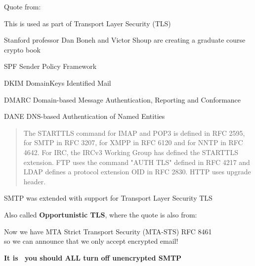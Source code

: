 \documentclass[Screen16to9,17pt]{foils}
\begin{document}
\begin{list2}
\item Quote from: {\small {}}
\item This is used as part of Transport Layer Security (TLS)
\item Stanford professor Dan Boneh and Victor Shoup are creating a graduate course crypto book  
\end{list2}



\begin{list2}
\item SPF Sender Policy Framework\\ {\footnotesize{}}
\item DKIM DomainKeys Identified Mail\\
{\footnotesize{}}
\item DMARC Domain-based Message Authentication, Reporting and Conformance\\
{\footnotesize{}}
\item DANE DNS-based Authentication of Named Entities\\ {\footnotesize{}}
\end{list2}



\begin{quote}
The STARTTLS command for IMAP and POP3 is defined in RFC 2595, for SMTP in RFC 3207, for XMPP in RFC 6120 and for NNTP in RFC 4642. For IRC, the IRCv3 Working Group
 has defined the STARTTLS extension. FTP uses the command "AUTH TLS" defined in RFC 4217 and LDAP defines a protocol extension OID in RFC 2830. HTTP uses upgrade header.
\end{quote}

\begin{list1}
\item SMTP was extended with support for Transport Layer Security TLS
\item Also called {\bf Opportunistic TLS}, where the quote is also from:\\ 
\item Now we have MTA Strict Transport Security (MTA-STS) RFC 8461\\
so we can announce that we only accept encrypted email!
\item {\bf It is \the\year\ you should ALL turn off unencrypted SMTP} {\myalert}
\end{list1}
\end{document}
